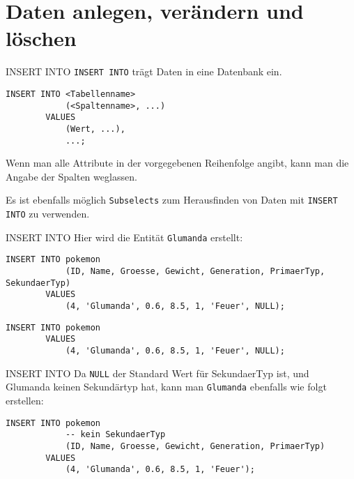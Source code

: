 \section{Daten anlegen, verändern und löschen}

\begin{sql}{INSERT INTO}
    \texttt{INSERT INTO} trägt Daten in eine Datenbank ein.

    \begin{lstlisting}[language=mysql]
        INSERT INTO <Tabellenname>
            (<Spaltenname>, ...)
        VALUES
            (Wert, ...),
            ...;
    \end{lstlisting}

    Wenn man alle Attribute in der vorgegebenen Reihenfolge angibt, kann man die Angabe der Spalten weglassen.

    Es ist ebenfalls möglich \texttt{Subselects} zum Herausfinden von Daten mit \texttt{INSERT INTO} zu verwenden.
\end{sql}

\begin{example}{INSERT INTO}
    Hier wird die Entität \texttt{Glumanda} erstellt:

    \begin{lstlisting}[language=mysql]
        INSERT INTO pokemon
            (ID, Name, Groesse, Gewicht, Generation, PrimaerTyp, SekundaerTyp)
        VALUES
            (4, 'Glumanda', 0.6, 8.5, 1, 'Feuer', NULL);
    \end{lstlisting}

    \begin{lstlisting}[language=mysql]
        INSERT INTO pokemon
        VALUES
            (4, 'Glumanda', 0.6, 8.5, 1, 'Feuer', NULL);
    \end{lstlisting}
\end{example}

\begin{example}{INSERT INTO}
    Da \texttt{NULL} der Standard Wert für SekundaerTyp ist, und Glumanda keinen Sekundärtyp hat, kann man \texttt{Glumanda} ebenfalls wie folgt erstellen:
    
    \begin{lstlisting}[language=mysql]
        INSERT INTO pokemon
            -- kein SekundaerTyp
            (ID, Name, Groesse, Gewicht, Generation, PrimaerTyp)
        VALUES
            (4, 'Glumanda', 0.6, 8.5, 1, 'Feuer');
    \end{lstlisting}
\end{example}

